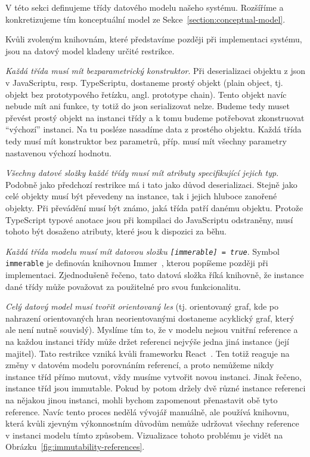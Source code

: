 V této sekci definujeme třídy datového modelu našeho systému.
Rozšíříme a konkretizujeme tím konceptuální model ze Sekce~\ref{section:conceptual-model}.

Kvůli zvoleným knihovnám, které představíme později při implementaci systému, jsou na datový model kladeny určité restrikce.

\emph{Každá třída musí mít bezparametrický konstruktor}.
Při deserializaci objektu z \acrshort{json} v JavaScriptu, resp. TypeScriptu, dostaneme prostý objekt (plain object, tj. objekt bez prototypového řetízku, angl. prototype chain).
Tento objekt navíc nebude mít ani funkce, ty totiž do \acrshort{json} serializovat nelze.
Budeme tedy muset převést prostý objekt na instanci třídy a k tomu budeme potřebovat zkonstruovat \enquote{výchozí} instanci.
Na tu posléze nasadíme data z prostého objektu.
Každá třída tedy musí mít konstruktor bez parametrů, příp. musí mít všechny parametry nastavenou výchozí hodnotu.

\emph{Všechny datové složky každé třídy musí mít atributy specifikující jejich typ}.
Podobně jako předchozí restrikce má i tato jako důvod deserializaci.
Stejně jako celé objekty musí být převedeny na instance, tak i jejich hluboce zanořené objekty.
Při převádění musí být známo, jaká třída patří danému objektu.
Protože TypeScript typové anotace jsou při kompilaci do JavaScriptu odstraněny, musí tohoto být dosaženo atributy, které jsou k dispozici za běhu.

\emph{Každá třída modelu musí mít datovou složku \texttt{[immerable] = true}}.
Symbol \texttt{immerable} je definován knihovnou Immer~\cite{michelweststrate_immer_2023}, kterou popíšeme později při implementaci.
Zjednodušeně řečeno, tato datová složka říká knihovně, že instance dané třídy může považovat za použitelné pro svou funkcionalitu.

\emph{Celý datový model musí tvořit orientovaný les} (tj. orientovaný graf, kde po nahrazení orientovaných hran neorientovanými dostaneme acyklický graf, který ale není nutně souvislý).
Myslíme tím to, že v modelu nejsou vnitřní reference a na každou instanci třídy může držet referenci nejvýše jedna jiná instance (její majitel).
Tato restrikce vzniká kvůli frameworku React~\cite{react_2023}.
Ten totiž reaguje na změny v datovém modelu porovnáním referencí, a proto nemůžeme nikdy instance tříd přímo mutovat, vždy musíme vytvořit novou instanci.
Jinak řečeno, instance tříd jsou immutable.
Pokud by potom držely dvě různé instance referenci na nějakou jinou instanci, mohli bychom zapomenout přenastavit obě tyto reference.
Navíc tento proces nedělá vývojář manuálně, ale používá knihovnu, která kvůli zjevným výkonnostním důvodům nemůže udržovat všechny reference v instanci modelu tímto způsobem.
Vizualizace tohoto problému je vidět na Obrázku~\ref{fig:immutability-references}.

